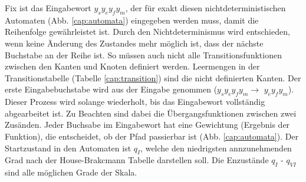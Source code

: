Fix ist das Eingabewort \flqq $y_sy_ey_fy_m$\frqq, der für exakt diesen nichtdeterministischen Automaten (Abb. \ref{cap:automata}) eingegeben werden muss, damit die Reihenfolge gewährleistet ist. Durch den Nichtdeterminismus wird entschieden, wenn keine Änderung des Zustandes mehr möglich ist, dass der nächste Buchstabe an der Reihe ist. So müssen auch nicht alle Transitionsfunktionen zwischen den Kanten und Knoten definiert werden. Leermengen in der Transitionstabelle (Tabelle \ref{cap:transition}) sind die nicht definierten Kanten. Der erste Eingabebuchstabe wird aus der Eingabe genommen (\flqq $y_sy_ey_fy_m$\frqq $\rightarrow$ \flqq $y_ey_fy_m$\frqq). Dieser Prozess wird solange wiederholt, bis das Eingabewort vollständig abgearbeitet ist. Zu Beachten sind dabei die Übergangsfunktionen zwischen zwei Zusänden. Jeder Buchsabe im Eingabewort hat eine Gewichtung (Ergebnis der Funktion), die entscheidet, ob der Pfad passierbar ist (Abb. \ref{cap:automata}). Der Startzustand in den Automaten ist $q_I$, welche den niedrigsten annzunehmenden Grad nach der House-Brakcmann Tabelle darstellen soll. Die Enzustände $q_I$ - $q_{VI}$  sind alle möglichen Grade der Skala.

\begin{table}[t]\vspace{1ex}\centering
  \caption[Übergangsfunktion $\delta$ des Automaten für die Bestimmung des Grades]{Übergangsfunktion $\delta$ des Automaten für die Bestimmung des Grades}\label{cap:transition}
\vspace{2ex}\end{table}\label{table:transition}

